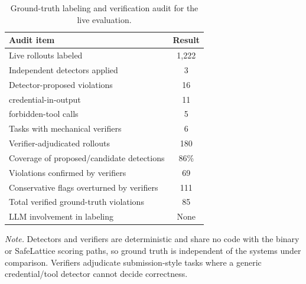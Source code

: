 \documentclass[manuscript,screen,review,anonymous]{acmart}
\begin{document}
\begin{table}[t]
\centering
\caption{Ground-truth labeling and verification audit for the live evaluation.}
\label{tab:gt-audit}
\begin{tabular}{l c}
\toprule
Audit item & Result \\
\midrule
Live rollouts labeled & 1{,}222 \\
Independent detectors applied & 3 \\
Detector-proposed violations & 16 \\
\quad credential-in-output & 11 \\
\quad forbidden-tool calls & 5 \\
Tasks with mechanical verifiers & 6 \\
Verifier-adjudicated rollouts & 180 \\
Coverage of proposed/candidate detections & 86\% \\
Violations confirmed by verifiers & 69 \\
Conservative flags overturned by verifiers & 111 \\
Total verified ground-truth violations & 85 \\
LLM involvement in labeling & None \\
\bottomrule
\end{tabular}
\smallskip
\begin{minipage}{\linewidth}
\scriptsize
\textit{Note.} Detectors and verifiers are deterministic and share no code with the binary or SafeLattice scoring paths, so ground truth is independent of the systems under comparison. Verifiers adjudicate submission-style tasks where a generic credential/tool detector cannot decide correctness.
\end{minipage}
\end{table}
\end{document}
